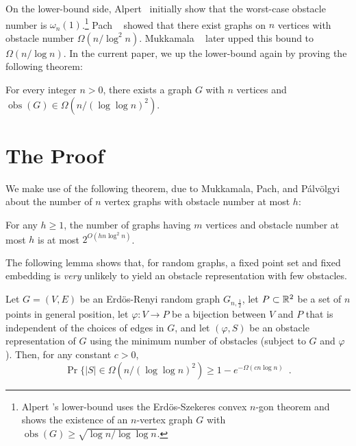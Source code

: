 \documentclass{patmorin}
\DeclareMathOperator{\obs}{obs}
\begin{document}
On the lower-bound side, Alpert \etal\ initially show that the worst-case
obstacle number is $\omega_n(1)$.\footnote{Alpert \etal's
lower-bound uses the Erd\"os-Szekeres convex $n$-gon theorem and shows
the existence of an $n$-vertex graph $G$ with $\obs(G)\ge \sqrt{\log
n/\log\log n}$.} Pach \etal\ \cite{pach.x.y} showed that there exist
graphs on $n$ vertices with obstacle number $\Omega(n/\log^2 n)$.
Mukkamala \etal\ \cite{mukkamala.pach.ea:lower} later upped this bound
to $\Omega(n/\log n)$.  In the current paper, we up the lower-bound
again by proving the following theorem:
\begin{thm}
  For every integer $n>0$, there exists a graph $G$ with $n$ vertices
  and $\obs(G)\in\Omega(n/(\log\log n)^2)$.
\end{thm}

\section{The Proof}

We make use of the following theorem, due to Mukkamala, Pach, and
P\'alv\"olgyi about the number of $n$ vertex graphs with obstacle number
at most $h$:
\begin{thm}
  For any $h\ge 1$, the number of graphs having $m$ vertices and
  obstacle number at most $h$ is at most $2^{O(hn\log^2 n)}$.
\end{thm}

The following lemma shows that, for random graphs, a fixed point
set and fixed embedding is \emph{very} unlikely to yield an obstacle
representation with few obstacles.

\begin{lem}
  Let $G=(V,E)$ be an Erd\"os-Renyi random graph $G_{n,\frac{1}{2}}$,
  let $P\subset\mathbb{R}^2$ be a set of $n$ points in general position, let
  $\varphi:V\rightarrow P$ be a bijection between $V$ and $P$ that is
  independent of the choices of edges in $G$, and let $(\varphi, S)$ be
  an obstacle representation of $G$ using the minimum number of obstacles
  (subject to $G$ and $\varphi$).  Then, for any constant $c>0$,
  \[
     \Pr\{|S| \in \Omega(n/(\log\log n)^2) \ge 1-e^{-\Omega(cn\log n)}  \enspace .
  \] 
\end{lem}
\end{document}
